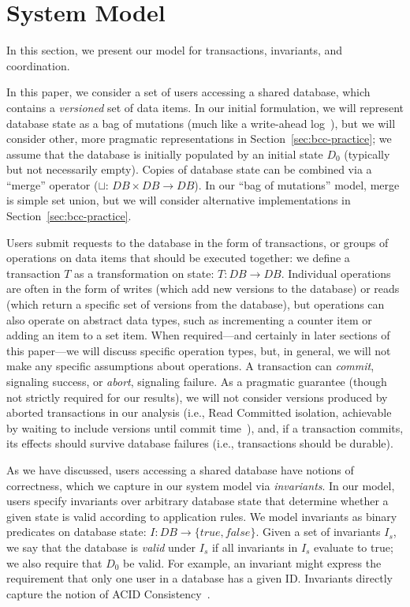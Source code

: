 
\section{System Model}
\label{sec:model}

In this section, we present our model for transactions, invariants,
and coordination.

 In this paper, we consider a set
of users accessing a shared database, which contains a
\textit{versioned} set of data items. In our initial formulation, we
will represent database state as a bag of mutations (much like a
write-ahead log~\cite{gray-book}), but we will consider other, more
pragmatic representations in Section~\ref{sec:bcc-practice}; we assume
that the database is initially populated by an initial state $D_0$
(typically but not necessarily empty). Copies of database state can be
combined via a ``merge'' operator ($\sqcup$: $DB \times DB \rightarrow
DB$). In our ``bag of mutations'' model, merge is simple set union,
but we will consider alternative implementations in
Section~\ref{sec:bcc-practice}.

Users submit requests to the database in the form of transactions, or
groups of operations on data items that should be executed together:
we define a transaction $T$ as a transformation on state: $T: DB
\rightarrow DB$. Individual operations are often in the form of writes
(which add new versions to the database) or reads (which return a
specific set of versions from the database), but operations can also
operate on abstract data types, such as incrementing a counter item or
adding an item to a set item. When required---and certainly in later
sections of this paper---we will discuss specific operation types,
but, in general, we will not make any specific assumptions about
operations. A transaction can \textit{commit}, signaling success, or
\textit{abort}, signaling failure. As a pragmatic guarantee (though
not strictly required for our results), we will not consider versions
produced by aborted transactions in our analysis (i.e., Read Committed
isolation, achievable by waiting to include versions until commit
time~\cite{hat-vldb,spanner}), and, if a transaction commits, its
effects should survive database failures (i.e., transactions should be
durable).

 As we have discussed, users accessing a shared
database have notions of correctness, which we capture in our system
model via \textit{invariants}. In our model, users specify invariants
over arbitrary database state that determine whether a given state is
valid according to application rules. We model invariants as binary
predicates on database state: $I: DB \rightarrow \{true,
false\}$. Given a set of invariants $I_s$, we say that the database is
\textit{valid} under $I_s$ if all invariants in $I_s$ evaluate to
true; we also require that $D_0$ be valid. For example, an invariant
might express the requirement that only one user in a database has a
given ID. Invariants directly capture the notion of ACID
Consistency~\cite{bernstein-book,gray-virtues}.

